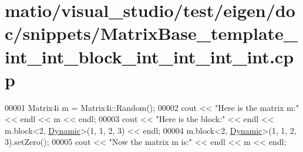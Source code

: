 \hypertarget{matio_2visual__studio_2test_2eigen_2doc_2snippets_2_matrix_base__template__int__int__block__int__int__int__int_8cpp_source}{}\section{matio/visual\+\_\+studio/test/eigen/doc/snippets/\+Matrix\+Base\+\_\+template\+\_\+int\+\_\+int\+\_\+block\+\_\+int\+\_\+int\+\_\+int\+\_\+int.cpp}
\label{matio_2visual__studio_2test_2eigen_2doc_2snippets_2_matrix_base__template__int__int__block__int__int__int__int_8cpp_source}

\begin{DoxyCode}
00001 Matrix4i m = Matrix4i::Random();
00002 cout << \textcolor{stringliteral}{"Here is the matrix m:"} << endl << m << endl;
00003 cout << \textcolor{stringliteral}{"Here is the block:"} << endl << m.block<2, \hyperlink{namespace_eigen_ad81fa7195215a0ce30017dfac309f0b2}{Dynamic}>(1, 1, 2, 3) << endl;
00004 m.block<2, \hyperlink{namespace_eigen_ad81fa7195215a0ce30017dfac309f0b2}{Dynamic}>(1, 1, 2, 3).setZero();
00005 cout << \textcolor{stringliteral}{"Now the matrix m is:"} << endl << m << endl;
\end{DoxyCode}
